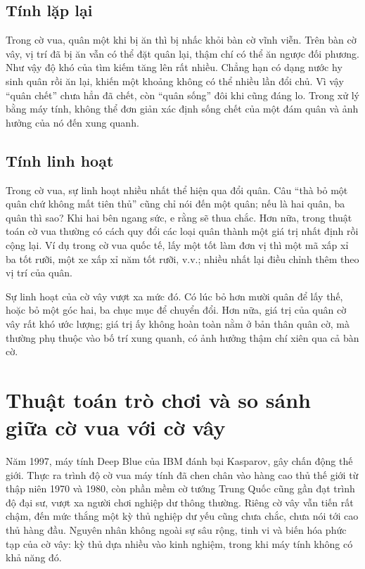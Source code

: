 \documentclass[11pt]{article}
\begin{document}
\subsection{Tính lặp lại}

Trong cờ vua, quân một khi bị ăn thì bị nhấc khỏi bàn cờ vĩnh viễn. Trên bàn
cờ vây, vị trí đã bị ăn vẫn có thể đặt quân lại, thậm chí có thể ăn ngược đối
phương. Như vậy độ khó của tìm kiếm tăng lên rất nhiều. Chẳng hạn có dạng
nước hy sinh quân rồi ăn lại, khiến một khoảng không có thể nhiều lần đổi
chủ. Vì vậy ``quân chết'' chưa hẳn đã chết, còn ``quân sống'' đôi khi cũng
đáng lo. Trong xử lý bằng máy tính, không thể đơn giản xác định sống chết của
một đám quân và ảnh hưởng của nó đến xung quanh.

\subsection{Tính linh hoạt}

Trong cờ vua, sự linh hoạt nhiều nhất thể hiện qua đổi quân. Câu ``thà bỏ một
quân chứ không mất tiên thủ'' cũng chỉ nói đến một quân; nếu là hai quân, ba
quân thì sao? Khi hai bên ngang sức, e rằng sẽ thua chắc. Hơn nữa, trong
thuật toán cờ vua thường có cách quy đổi các loại quân thành một giá trị nhất
định rồi cộng lại. Ví dụ trong cờ vua quốc tế, lấy một tốt làm đơn vị thì một
mã xấp xỉ ba tốt rưỡi, một xe xấp xỉ năm tốt rưỡi, v.v.; nhiều nhất lại điều
chỉnh thêm theo vị trí của quân.

Sự linh hoạt của cờ vây vượt xa mức đó. Có lúc bỏ hơn mười quân để lấy thế,
hoặc bỏ một góc hai, ba chục mục để chuyển đổi. Hơn nữa, giá trị của quân cờ
vây rất khó ước lượng; giá trị ấy không hoàn toàn nằm ở bản thân quân cờ, mà
thường phụ thuộc vào bố trí xung quanh, có ảnh hưởng thậm chí xiên qua cả bàn
cờ.

\section{Thuật toán trò chơi và so sánh giữa cờ vua với cờ vây}

Năm 1997, máy tính Deep Blue của IBM đánh bại Kasparov, gây chấn động thế
giới. Thực ra trình độ cờ vua máy tính đã chen chân vào hàng cao thủ thế giới
từ thập niên 1970 và 1980, còn phần mềm cờ tướng Trung Quốc cũng gần đạt
trình độ đại sư, vượt xa người chơi nghiệp dư thông thường. Riêng cờ vây vẫn
tiến rất chậm, đến mức thắng một kỳ thủ nghiệp dư yếu cũng chưa chắc, chưa
nói tới cao thủ hàng đầu. Nguyên nhân không ngoài sự sâu rộng, tinh vi và
biến hóa phức tạp của cờ vây: kỳ thủ dựa nhiều vào kinh nghiệm, trong khi máy
tính không có khả năng đó.
\end{document}
